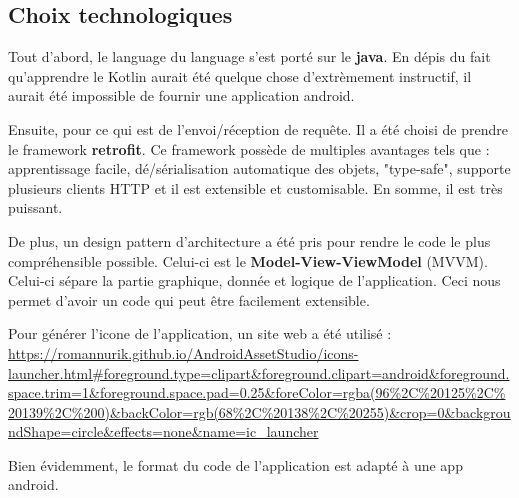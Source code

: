 \subsection{Choix technologiques}
\begin{flushleft}
Tout d'abord, le language du language s'est porté sur le \textbf{java}. En dépis du fait qu'apprendre le Kotlin aurait été quelque chose d'extrèmement instructif, il aurait été impossible de fournir une application android.  
\end{flushleft}
\begin{flushleft}
    Ensuite, pour ce qui est de l'envoi/réception de requête. Il a été choisi de prendre le framework \textbf{retrofit}. Ce framework possède de multiples avantages tels que : apprentissage facile, dé/sérialisation automatique des objets, "type-safe", supporte plusieurs clients HTTP et il est extensible et customisable. En somme, il est très puissant.
\end{flushleft}
 \begin{flushleft}
     De plus, un design pattern d'architecture a été pris pour rendre le code le plus compréhensible possible. Celui-ci est le \textbf{Model-View-ViewModel} (MVVM). Celui-ci sépare la partie graphique, donnée et logique de l'application. Ceci nous permet d'avoir un code qui peut être facilement extensible.
 \end{flushleft}
 \begin{flushleft}
     Pour générer l'icone de l'application, un site web a été utilisé : \url{https://romannurik.github.io/AndroidAssetStudio/icons-launcher.html#foreground.type=clipart&foreground.clipart=android&foreground.space.trim=1&foreground.space.pad=0.25&foreColor=rgba(96%2C%20125%2C%20139%2C%200)&backColor=rgb(68%2C%20138%2C%20255)&crop=0&backgroundShape=circle&effects=none&name=ic_launcher}
 \end{flushleft}
 \begin{flushleft}
     Bien évidemment, le format du code de l'application est adapté à une app android.
 \end{flushleft}